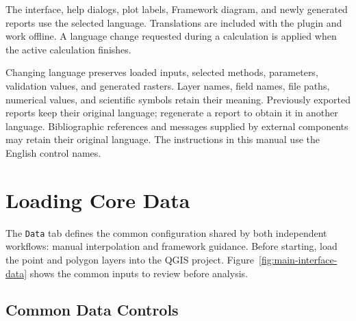 \documentclass[11pt,a4paper]{article}
\begin{document}
The interface, help dialogs, plot labels, Framework diagram, and newly generated reports use the selected language. Translations are included with the plugin and work offline. A language change requested during a calculation is applied when the active calculation finishes.

Changing language preserves loaded inputs, selected methods, parameters, validation values, and generated rasters. Layer names, field names, file paths, numerical values, and scientific symbols retain their meaning. Previously exported reports keep their original language; regenerate a report to obtain it in another language. Bibliographic references and messages supplied by external components may retain their original language. The instructions in this manual use the English control names.

\section{Loading Core Data}

The \texttt{Data} tab defines the common configuration shared by both independent workflows: manual interpolation and framework guidance. Before starting, load the point and polygon layers into the QGIS project. Figure~\ref{fig:main-interface-data} shows the common inputs to review before analysis.

\subsection{Common Data Controls}
\end{document}
